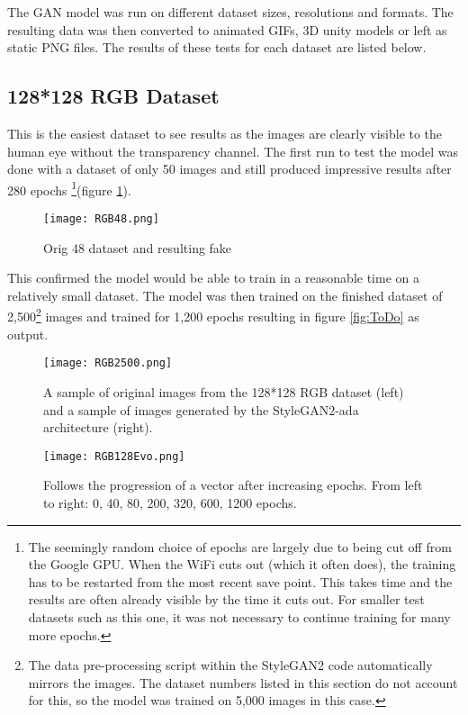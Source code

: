 \documentclass[a4paper]{report}
\begin{document}
The GAN model was run on different dataset sizes, resolutions and formats. The resulting data was then converted to animated GIFs, 3D unity models or left as static PNG files. The results of these tests for each dataset are listed below.

\subsection{128*128 RGB Dataset}

This is the easiest dataset to see results as the images are clearly visible to the human eye without the transparency channel. The first run to test the model was done with a dataset of only 50 images and still produced impressive results after 280 epochs \footnote{The seemingly random choice of epochs are largely due to being cut off from the Google GPU. When the WiFi cuts out (which it often does), the training has to be restarted from the most recent save point. This takes time and the results are often already visible by the time it cuts out. For smaller test datasets such as this one, it was not necessary to continue training for many more epochs.}(figure \ref{fig:RGB48}).

\begin{figure}[H]
    \centering
        \texttt{[image: RGB48.png]}
        \caption{Orig 48 dataset and resulting fake}
        \label{fig:RGB48}
\end{figure}

This confirmed the model would be able to train in a reasonable time on a relatively small dataset. The model was then trained on the finished dataset of 2,500\footnote{The data pre-processing script within the StyleGAN2 code automatically mirrors the images. The dataset numbers listed in this section do not account for this, so the model was trained on 5,000 images in this case.} images and trained for 1,200 epochs resulting in figure \ref{fig:ToDo} as output.

\begin{figure}[H]
    \centering
        \texttt{[image: RGB2500.png]}
        \caption{A sample of original images from the 128*128 RGB dataset (left) and a sample of images generated by the StyleGAN2-ada architecture (right).}
        \label{fig:RGB2500}
\end{figure}

\begin{figure}[H]
    \centering
        \texttt{[image: RGB128Evo.png]}
        \caption{Follows the progression of a vector after increasing epochs. From left to right: 0, 40, 80, 200, 320, 600, 1200 epochs.}
        \label{fig:RGB2500Evo}
\end{figure}
\end{document}
